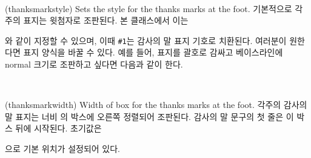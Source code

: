 
\begin{syntax}
\cmd{\thanksmarkstyle} \\
\end{syntax}
\glossary(thanksmarkstyle)%
  {}%
  {Sets the style for the thanks marks at the foot.}
기본적으로 각주의 표지는 윗첨자로 조판된다.
본 클래스에서 이는
\begin{lcode}
\end{lcode}
와 같이 지정할 수 있으며, 이때 \verb|#1|는 감사의 말 표지 기호로 치환된다.
여러분이 원한다면 표지 양식을 바꿀 수 있다.
예를 들어, 표지를 괄호로 감싸고 베이스라인에 normal 크기로 조판하고 싶다면
다음과 같이 한다.
\begin{lcode}
\end{lcode}


\begin{syntax}
\lnc{\thanksmarkwidth} \\
\end{syntax}
\glossary(thanksmarkwidth)%
  {}%
  {Width of box for the thanks marks at the foot.}
각주의 감사의 말 표지는 너비 \lnc{\thanksmarkwidth}의
박스에 오른쪽 정렬되어 조판된다.
감사의 말 문구의 첫 줄은 이 박스 뒤에 시작된다.
초기값은
\begin{lcode}
\setlength{\thanksmarkwidth}{1.8em}
\end{lcode}
으로 기본 위치가 설정되어 있다.

